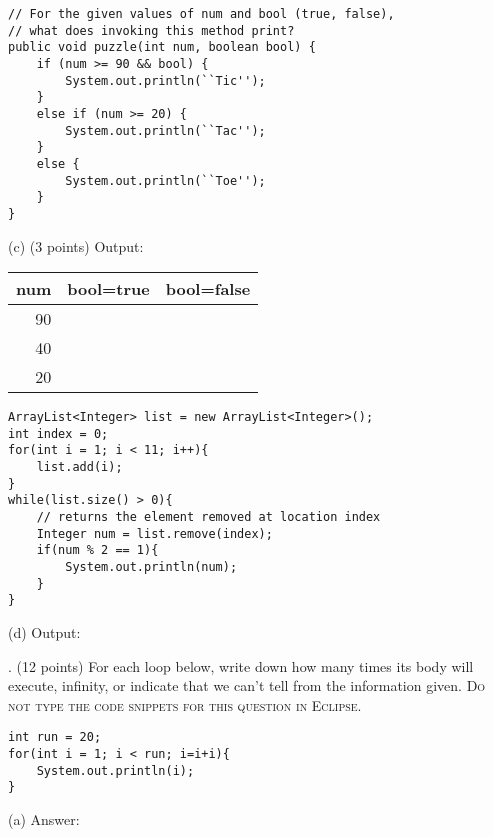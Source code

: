 \documentclass[12pt,twoside]{article}
\newcommand{\fillInBlank}[1][0.5in]{\underline{\hspace{#1}}}
\begin{document}
\begin{minipage}{0.60\linewidth}
\begin{lstlisting}
// For the given values of num and bool (true, false), 
// what does invoking this method print?
public void puzzle(int num, boolean bool) {
	if (num >= 90 && bool) {
		System.out.println(``Tic'');
	}
	else if (num >= 20) {
		System.out.println(``Tac'');
	}
	else {
		System.out.println(``Toe'');	
	}
}
\end{lstlisting}
\end{minipage}
\hspace{0.25in}
\begin{minipage}{0.3\linewidth}
(c) (3 points) Output: 

\vspace{0.25in}

\begin{tabular}{|r|c|c|}\hline
\textbf{num} & \textbf{bool=true} & \textbf{bool=false} \\ \hline
90 & ~ &  ~ \\ \hline
40 &  &  \\  \hline
20 &  &  \\ \hline
\end{tabular}
\end{minipage}
\vfill
\hfill
\begin{minipage}{0.60\linewidth}
\begin{lstlisting}
ArrayList<Integer> list = new ArrayList<Integer>();
int index = 0;
for(int i = 1; i < 11; i++){
	list.add(i);
}
while(list.size() > 0){
	// returns the element removed at location index
	Integer num = list.remove(index);
	if(num % 2 == 1){
		System.out.println(num);
	}
}
\end{lstlisting}
\end{minipage}
\hspace{0.25in}
(d) Output: \fillInBlank[1in]
\vfill


. (12 points) For each loop below, write down how many times its body will execute, infinity, or indicate that we can't tell from the information given. \textsc{Do not type the code snippets for this question in Eclipse}.
\vspace{0.25in}

\hfill
\begin{minipage}{0.58\linewidth}
\begin{lstlisting}
int run = 20;
for(int i = 1; i < run; i=i+i){
	System.out.println(i);
}
\end{lstlisting}
\end{minipage}
\hspace{0.25in}
\begin{minipage}[t]{0.25\linewidth}
(a) Answer: \fillInBlank
\end{minipage}
\vfill
\end{document}
